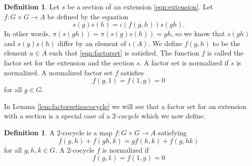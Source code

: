 \documentclass{dcthesis}
\newcommand{\defi}[1]{\textsf{#1}}
\numberwithin{equation}{section}
\theoremstyle{definition}
\newtheorem{definition}[equation]{Definition}
\theoremstyle{remark}
\begin{document}
{{{    %
    \begin{definition}
      \label{def:factorset}
      Let $s$ be a section of an extension
      \eqref{eqn:extension}.
      Let $f\colon G\times G\to A$
      be defined by the equation
      \begin{equation}
        \label{eqn:factorset}
        s(g)s(h) = \iota(f(g,h))s(gh).
      \end{equation}
      In other words,
      $\pi(s(gh)) = \pi(s(g)s(h)) = gh$,
      so we know that
      $s(gh)$ and $s(g)s(h)$ differ by an element of $\iota(A)$.
      We define $f(g,h)$ to be the element $a\in A$
      such that
      \eqref{eqn:factorset}
      is satisfied.
      The function $f$ is called the \defi{factor set}
      for the extension and the section $s$.
      A factor set is \defi{normalized}
      if $s$ is normalized.
      A normalized factor set $f$ satisfies
      \[
        f(g,1)=f(1,g)=0
      \]
      for all $g\in G$.
    \end{definition}
    In Lemma \ref{lem:factorsetisacocycle}
    we will see that a factor set
    for an extension with a section
    is a special case of a
    \emph{$2$-cocycle}
    which we now define.
    \begin{definition}
      \label{def:twococycle}
      A \defi{$2$-cocycle}
      is a map
      $f\colon G\times G\to A$
      satisfying
      \begin{equation}
        \label{eqn:twococycle}
        f(g,h)+f(gh,k)=gf(h,k)+f(g,hk)
      \end{equation}
      for all $g,h,k\in G$.
      A $2$-cocycle $f$ is \defi{normalized}
      if
      \[
        f(g,1)=f(1,g)=0
      \]

\end{definition}}}}
\end{document}
